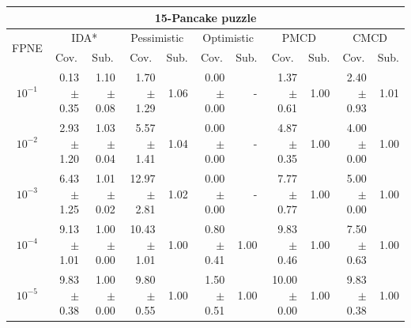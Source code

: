 \documentclass[letterpaper]{article}
\begin{document}
\begin{table}[t]
\centering
\setlength{\tabcolsep}{4 pt}
\begin{tabular}{| c | r  r | r  r | r  r | r  r | r  r |}
\hline
\multicolumn{11}{|c|}{\textbf{15-Pancake puzzle}} \\
\hline
\multirow{2}{*}{FPNE}	& \multicolumn{2}{|c|}{IDA*} 	& \multicolumn{2}{|c|}{Pessimistic} 	& \multicolumn{2}{|c|}{Optimistic} 	& \multicolumn{2}{|c|}{PMCD} 	& \multicolumn{2}{|c|}{CMCD} 	\\
\cline{2-11}
	& \multicolumn{1}{c}{Cov.} & \multicolumn{1}{c|}{Sub.} 	& \multicolumn{1}{c}{Cov.} & \multicolumn{1}{c|}{Sub.} 	& \multicolumn{1}{c}{Cov.} & \multicolumn{1}{c|}{Sub.} 	& \multicolumn{1}{c}{Cov.} & \multicolumn{1}{c|}{Sub.} 	& \multicolumn{1}{c}{Cov.} & \multicolumn{1}{c|}{Sub.} 	\\
\hline


$10^{-1}$	& 0.13 $\pm$ 0.35	& 1.10 $\pm$ 0.08	& 1.70 $\pm$ 1.29	& 1.06	& 0.00 $\pm$ 0.00	& - 	& 1.37 $\pm$ 0.61	& 1.00	& 2.40 $\pm$ 0.93	& 1.01	\\

$10^{-2}$	& 2.93 $\pm$ 1.20	& 1.03 $\pm$ 0.04	& 5.57 $\pm$ 1.41	& 1.04	& 0.00 $\pm$ 0.00	& - 	& 4.87 $\pm$ 0.35	& 1.00	& 4.00 $\pm$ 0.00	& 1.00	\\

$10^{-3}$	& 6.43 $\pm$ 1.25	& 1.01 $\pm$ 0.02	& 12.97 $\pm$ 2.81	& 1.02	& 0.00 $\pm$ 0.00	& - 	& 7.77 $\pm$ 0.77	& 1.00	& 5.00 $\pm$ 0.00	& 1.00	\\

$10^{-4}$	& 9.13 $\pm$ 1.01	& 1.00 $\pm$ 0.00	& 10.43 $\pm$ 1.01	& 1.00	& 0.80 $\pm$ 0.41	& 1.00	& 9.83 $\pm$ 0.46	& 1.00	& 7.50 $\pm$ 0.63	& 1.00	\\

$10^{-5}$	& 9.83 $\pm$ 0.38	& 1.00 $\pm$ 0.00	& 9.80 $\pm$ 0.55	& 1.00	& 1.50 $\pm$ 0.51	& 1.00	& 10.00 $\pm$ 0.00	& 1.00	& 9.83 $\pm$ 0.38	& 1.00	\\




\end{tabular}
\end{table}
\end{document}
